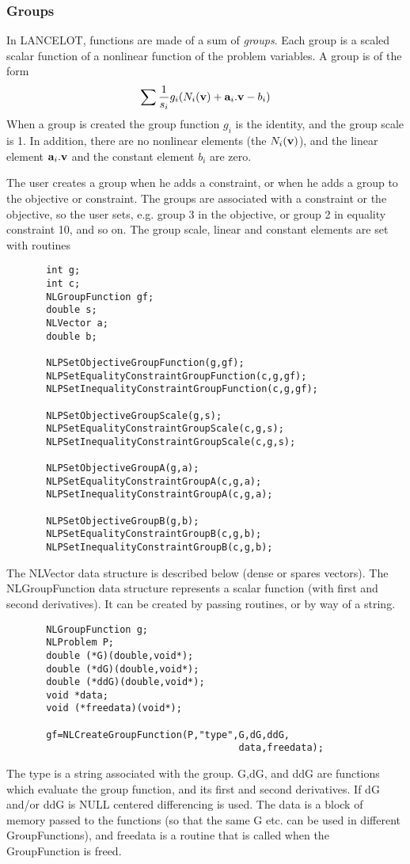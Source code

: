 \documentclass[12pt]{article}
\begin{document}
   \subsubsection{Groups}
     In LANCELOT, functions are made of a sum of {\it groups}. Each group is a scaled scalar function of a nonlinear
     function of the problem variables. A group is of the form
     \begin{displaymath}
      \sum {1\over{s_i}}g_i(N_i({\bf v})+ {\bf a}_i.{\bf v}-b_i)
     \end{displaymath}
     When a group is created the group function $g_i$ is the identity, and the group scale is 1. In addition, there are no
     nonlinear elements (the $N_i({\bf v})$), and the linear element ${\bf a}_i.{\bf v}$ and the constant element
     $b_i$ are zero. 

     The user creates a group when he adds a constraint, or when he adds a group to the objective or constraint.
     The groups are associated with a constraint or the objective, so the user sets, e.g. group 3 in the objective,
     or group 2 in equality constraint 10, and so on. The group scale, linear and constant elements are set with routines 
     \begin{verbatim}
       int g;
       int c;
       NLGroupFunction gf;
       double s;
       NLVector a;
       double b;

       NLPSetObjectiveGroupFunction(g,gf);
       NLPSetEqualityConstraintGroupFunction(c,g,gf);
       NLPSetInequalityConstraintGroupFunction(c,g,gf);

       NLPSetObjectiveGroupScale(g,s);
       NLPSetEqualityConstraintGroupScale(c,g,s);
       NLPSetInequalityConstraintGroupScale(c,g,s);

       NLPSetObjectiveGroupA(g,a);
       NLPSetEqualityConstraintGroupA(c,g,a);
       NLPSetInequalityConstraintGroupA(c,g,a);

       NLPSetObjectiveGroupB(g,b);
       NLPSetEqualityConstraintGroupB(c,g,b);
       NLPSetInequalityConstraintGroupB(c,g,b);
     \end{verbatim}
     The NLVector data structure is described below (dense or spares vectors). The NLGroupFunction data structure
     represents a scalar function (with first and second derivatives). It can be created by passing routines, or
     by way of a string.
     \begin{verbatim}
       NLGroupFunction g;
       NLProblem P;
       double (*G)(double,void*);
       double (*dG)(double,void*);
       double (*ddG)(double,void*);
       void *data;
       void (*freedata)(void*);

       gf=NLCreateGroupFunction(P,"type",G,dG,ddG,
                                         data,freedata);
     \end{verbatim}
      The type is a string associated with the group. G,dG, and ddG are functions which evaluate the group function,
      and its first and second derivatives. If dG and/or ddG is NULL centered differencing is used. The data is a
      block of memory passed to the functions (so that the same G etc. can be used in different GroupFunctions), and
      freedata is a routine that is called when the GroupFunction is freed.
\end{document}
